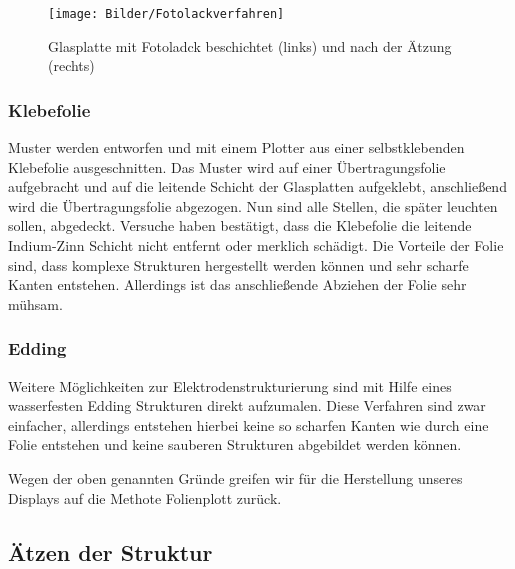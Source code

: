 \begin{figure}[t]
  \centering
  \texttt{[image: Bilder/Fotolackverfahren]}
  \caption{Glasplatte mit Fotoladck beschichtet (links) und nach der Ätzung (rechts)}
  \label{Fotolackverfahren}
\end{figure}



\subsubsection*{Klebefolie}\label{subsec:klebefolie}
Muster werden entworfen und mit einem Plotter aus einer selbstklebenden Klebefolie ausgeschnitten. Das Muster wird auf einer Übertragungsfolie aufgebracht und auf die leitende Schicht der Glasplatten aufgeklebt, anschließend wird die Übertragungsfolie abgezogen. Nun sind alle Stellen, die später leuchten sollen, abgedeckt. Versuche haben bestätigt, dass die Klebefolie die leitende Indium-Zinn Schicht nicht entfernt oder merklich schädigt. Die Vorteile der Folie sind, dass komplexe Strukturen hergestellt werden können und sehr scharfe Kanten entstehen. Allerdings ist das anschließende Abziehen der Folie sehr mühsam.


\subsubsection*{Edding}
Weitere Möglichkeiten zur Elektrodenstrukturierung sind mit Hilfe eines wasserfesten Edding Strukturen direkt aufzumalen. Diese Verfahren sind zwar einfacher, allerdings entstehen hierbei keine so scharfen Kanten wie durch eine Folie entstehen und keine sauberen Strukturen abgebildet werden können.

Wegen der oben genannten Gründe greifen wir für die Herstellung unseres Displays auf die Methote Folienplott zurück.


\subsection{Ätzen der Struktur}

